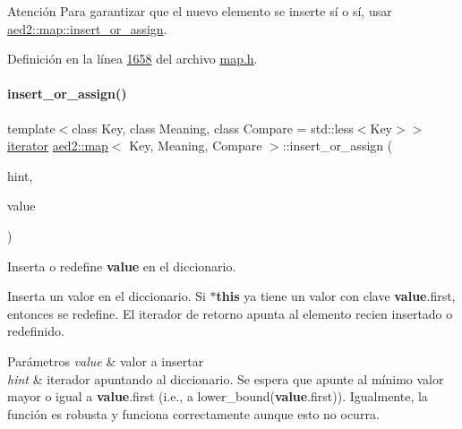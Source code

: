 \begin{DoxyAttention}{Atención}
Para garantizar que el nuevo elemento se inserte sí o sí, usar \hyperlink{classaed2_1_1map_a2ef6723c183916276b0afc4a4c721475_a2ef6723c183916276b0afc4a4c721475}{aed2\+::map\+::insert\+\_\+or\+\_\+assign}. 
\end{DoxyAttention}


Definición en la línea \hyperlink{map_8h_source_l01658}{1658} del archivo \hyperlink{map_8h_source}{map.\+h}.

\mbox{\label{classaed2_1_1map_a2ef6723c183916276b0afc4a4c721475_a2ef6723c183916276b0afc4a4c721475}} 
\paragraph{\texorpdfstring{insert\+\_\+or\+\_\+assign()}{insert\_or\_assign()}\hspace{0.1cm}{\footnotesize\ttfamily [1/2]}}
{\footnotesize\ttfamily template$<$class Key, class Meaning, class Compare = std\+::less$<$\+Key$>$$>$ \\
\hyperlink{classaed2_1_1map_1_1iterator}{iterator} \hyperlink{classaed2_1_1map}{aed2\+::map}$<$ Key, Meaning, Compare $>$\+::insert\+\_\+or\+\_\+assign (\begin{DoxyParamCaption}\item[{\hyperlink{classaed2_1_1map_1_1const__iterator}{const\+\_\+iterator}}]{hint,  }\item[{const \hyperlink{classaed2_1_1map_a719db98e0ff9a837610f76be33264680_a719db98e0ff9a837610f76be33264680}{value\+\_\+type} \&}]{value }\end{DoxyParamCaption})\hspace{0.3cm}{\ttfamily [inline]}}



Inserta o redefine {\bfseries value} en el diccionario. 

Inserta un valor en el diccionario. Si {\bfseries $\ast$this} ya tiene un valor con clave {\bfseries value}.first, entonces se redefine. El iterador de retorno apunta al elemento recien insertado o redefinido.


\begin{DoxyParams}{Parámetros}
{\em value} & valor a insertar \\
\hline
{\em hint} & iterador apuntando al diccionario. Se espera que apunte al mínimo valor mayor o igual a {\bfseries value}.first (i.\+e., a lower\+\_\+bound({\bfseries value}.first)). Igualmente, la función es robusta y funciona correctamente aunque esto no ocurra. \\
\hline
\end{DoxyParams}

